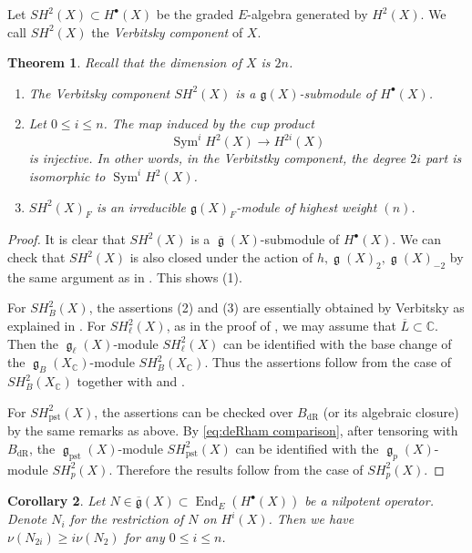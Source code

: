 \documentclass[12pt,reqno]{amsart}
\newtheorem{thm}{Theorem}[section]
\newtheorem{cor}[thm]{Corollary}
\theoremstyle{definition}
\newcommand{\C}{{\mathds C}}
\newcommand\End{\mathop{\mathrm{End}}\nolimits}
\renewcommand\ge{\mathop{\mathfrak{g}}\nolimits}
\newcommand\Sym{\mathop{\mathrm{Sym}}\nolimits}
\newcommand\dR{\mathop{\mathrm{dR}}}
\newcommand{\frg}{\mathfrak{g}}
\DeclareMathOperator{\pst}{pst}
\numberwithin{equation}{section}
\begin{document}
Let $SH^2 (X)  \subset H^{\bullet} (X)$ be the graded $E$-algebra generated by $H^2(X)$.
We call $SH^2 (X)$ the \emph{Verbitsky component} of $X$.
\begin{thm}
\label{thm:Verbitskycomponent Betti etale p-adic}
Recall that the dimension of $X$ is $2n$.
\begin{enumerate}
    \item The Verbitsky component $SH^2 (X)$ is a $\frg(X)$-submodule of $H^{\bullet} (X)$.
    \item Let $0 \leq i \leq n$. The map induced by the cup product 
    \[
    \Sym^{i}H^2 (X) \to H^{2i} (X)
    \]
    is injective. In other words, in the Verbitstky component, the degree $2i$ part is isomorphic to $\Sym^{i}H^2 (X)$.
\item $SH^2 (X)_F$ is an irreducible $\frg(X)_F$-module of highest weight $(n)$.
\end{enumerate}
\end{thm}

\begin{proof}
It is clear that
$SH^2 (X)$
is a
$\overline{\ge}(X)$-submodule of $H^{\bullet} (X)$.
We can check that 
$SH^2 (X)$
is also closed under the action of $h, \ge(X)_2, \ge(X)_{-2}$
by the same argument as in \cite[Theorem 2.15]{GKLR}.
This shows (1).

For $SH^2_B(X)$,
the assertions (2) and (3) are essentially obtained by
Verbitsky
as explained in \cite[Theorem 2.15]{GKLR}.
For $SH^2_\ell(X)$,
as in the proof of , we may assume that $\overline{L} \subset \C$.
Then the $\ge_\ell(X)$-module
$SH^2_\ell(X)$
can be identified with the base change of the $\ge_B(X_\C)$-module
$SH^2_B(X_\C)$.
Thus the assertions follow from
the case of $SH^2_B(X_\C)$
together with
and
.

For $SH^2_{\pst}(X)$,
the assertions can be checked over
$B_{\dR}$ (or its algebraic closure) by the same remarks as above.
By \eqref{eq:deRham comparison},
after tensoring with $B_{\dR}$,
the $\ge_{\pst}(X)$-module
$SH^2_{\pst}(X)$
can be identified with the $\ge_p(X)$-module $SH^2_p(X)$.
Therefore
the results follow from the case of $SH^2_p(X)$.
\end{proof}



\begin{cor}
\label{cor:lowerboundbySym}
Let $N \in \overline{\frg}(X) \subset \End_E(H^{\bullet}(X))$ be a nilpotent operator. Denote $N_{i}$ for the restriction of $N$ on $H^i(X)$. Then we have
$
\nu(N_{2i}) \geq i \nu(N_2)
$
for any $0 \leq i \leq n$.
\end{cor}
\end{document}
